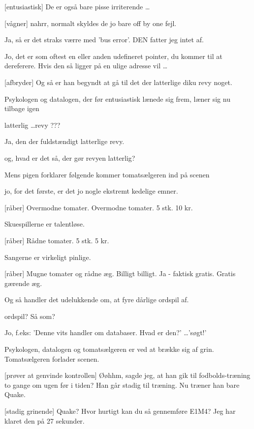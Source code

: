 \documentclass[danish]{article}
\begin{document}
\begin{sketch}
 [entusiastisk] De er også bare pisse irriterende \ldots

 [vågner] nahrr, normalt skyldes de jo bare off by one fejl.

 Ja, så er det straks værre med 'bus error'. DEN fatter jeg
intet af.

 Jo, det er som oftest en eller anden udefineret pointer, du
kommer til at dereferere. Hvis den så ligger på en ulige adresse vil \ldots

 [afbryder] Og så er han begyndt at gå til det der latterlige
diku revy noget.

\scene Psykologen og datalogen, der før entusiastisk lænede sig frem, læner
  sig nu tilbage igen

 latterlig \ldots revy ???

 Ja, den der fuldstændigt latterlige revy.

 og, hvad er det så, der gør revyen latterlig?

\scene Mens pigen forklarer følgende kommer tomatsælgeren ind på scenen

 jo, for det første, er det jo nogle ekstremt kedelige emner.

 [råber] Overmodne tomater. Overmodne tomater. 5 stk. 10 kr.

 Skuespillerne er talentløse.

 [råber] Rådne tomater. 5 stk. 5 kr.

 Sangerne er virkeligt pinlige.

 [råber] Mugne tomater og rådne æg. Billigt billigt. Ja -
faktisk gratis. Gratis gærende æg.

 Og så handler det udelukkende om, at fyre dårlige ordspil af.

 ordspil? Så som?

 Jo, f.eks: 'Denne vits handler om databaser. Hvad er den?'
\ldots 'søgt!'

\scene Psykologen, datalogen og tomatsælgeren er ved at brække sig af
grin. Tomatsælgeren forlader scenen.

 [prøver at genvinde kontrollen] Øøhhm, sagde jeg, at han gik
til fodbolds-træning to gange om ugen før i tiden? Han går stadig til
træning. Nu træner han bare Quake.

 [stadig grinende] Quake? Hvor hurtigt kan du så gennemføre
E1M4? Jeg har klaret den på 27 sekunder.


\end{sketch}
\end{document}
